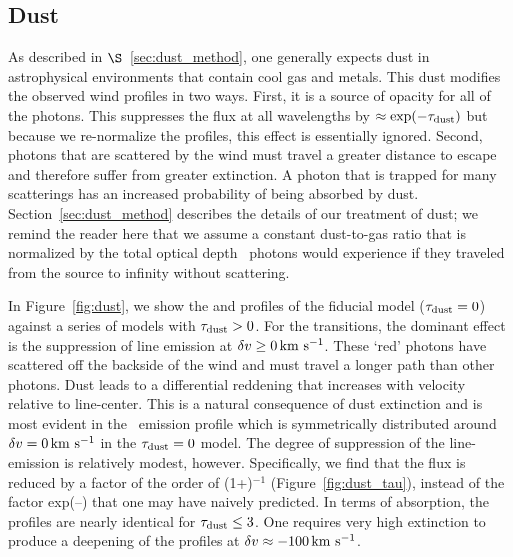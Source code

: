 \documentclass[12pt,preprint]{aastex}
\begin{document}
\subsection{Dust}
\label{sec:dust}

As described in $\S$~\ref{sec:dust_method}, 
one generally expects dust in astrophysical environments that contain
cool gas and metals.  This dust 
modifies the observed wind profiles in two ways. 
First, it is a source of opacity for all of 
the photons.  This suppresses the flux at all
wavelengths by $\approx \exp(-\tau_{\rm dust})$ but because we re-normalize the
profiles, this effect is essentially ignored.  Second, photons that are
scattered by the wind must travel a greater
distance to escape and therefore suffer from greater extinction.  A photon that is
trapped for many scatterings %
has an increased 
probability of being absorbed
by dust.  
Section~\ref{sec:dust_method} describes the details of our treatment of dust; we 
remind the reader here that we assume a constant dust-to-gas ratio 
that is normalized by the total optical
depth \taud\ photons would experience if they traveled from the
source to infinity without scattering. 

In Figure~\ref{fig:dust}, we show the  and 
profiles of the fiducial model ($\tau_{\rm dust} = 0$) against a series of
models with $\tau_{\rm dust} > 0$.  For the  transitions, the
dominant effect is the suppression of line emission at $\delta v \ge 0
\, {\rm km~s^{-1}}$.  These `red' photons have scattered off the
backside of the wind and must travel a longer path than other
photons.  Dust leads to a differential reddening that increases with 
velocity relative to line-center. This is a natural consequence of dust
extinction and is most evident in the \feiic\ 
emission profile which is symmetrically distributed around
$\delta v= 0 \, {\rm km~s^{-1}}$ in the $\tau_{\rm dust}=0$ model.   
The degree of suppression of the line-emission is relatively modest,
however.  Specifically, we find that the flux is reduced by a factor 
of the order of (1+\taud)$^{-1}$ (Figure~\ref{fig:dust_tau}),
instead of the factor
exp(--\taud) that one may have naively predicted. 
In terms of absorption, the profiles are
nearly identical for $\tau_{\rm dust} \le 3$.  One requires very high
extinction to %
produce a deepening of the profiles at 
$\delta v \approx -100 \, {\rm km~s^{-1}}$.
\end{document}
